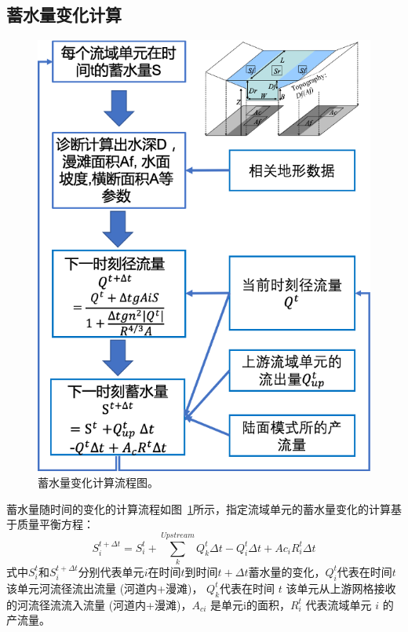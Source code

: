 \subsection{蓄水量变化计算}
{
\begin{figure}[]
\centering
\includegraphics{Figures/陆地表面的水分循环/蓄水量变化计算流程图.png}
\caption{蓄水量变化计算流程图。 }
\label{fig:蓄水量变化计算流程图}
\end{figure}
}
蓄水量随时间的变化的计算流程如图~\ref{fig:蓄水量变化计算流程图}所示，指定流域单元的蓄水量变化的计算基于质量平衡方程：
\begin{equation}
S_{i}^{t+\Delta t}=S_{i}^{t}+\sum_{k}^{Upstream} Q_{k}^{t} \Delta t-Q_{i}^{t} \Delta t+A c_{i} R_{i}^{t} \Delta t
\end{equation}
式中$S_{i}^{t}$和$S_{i}^{t+\Delta t}$分别代表单元$i$在时间$t$到时间$t+\Delta t$蓄水量的变化，$Q_i^t$代表在时间$t$该单元河流径流出流量 (河道内+漫滩)，
$Q_k^t$代表在时间 $t$ 该单元从上游网格接收的河流径流流入流量 (河道内+漫滩)，$A_{ci}$ 是单元i的面积，$R_i^t$ 代表流域单元 $i$ 的产流量。

